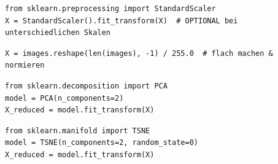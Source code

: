 
\begin{propertylist}[Faustregeln]
\end{propertylist}

\begin{codebox}
\begin{lstlisting}[style=CodeExpert]
from sklearn.preprocessing import StandardScaler
X = StandardScaler().fit_transform(X)  # OPTIONAL bei unterschiedlichen Skalen
\end{lstlisting}
\end{codebox}

\begin{codebox}
\begin{lstlisting}[style=CodeExpert]
X = images.reshape(len(images), -1) / 255.0  # flach machen & normieren
\end{lstlisting}
\end{codebox}

\begin{codebox}
\begin{lstlisting}[style=CodeExpert]
from sklearn.decomposition import PCA
model = PCA(n_components=2)
X_reduced = model.fit_transform(X)
\end{lstlisting}
\end{codebox}

\begin{codebox}
\begin{lstlisting}[style=CodeExpert]
from sklearn.manifold import TSNE
model = TSNE(n_components=2, random_state=0)
X_reduced = model.fit_transform(X)
\end{lstlisting}
\end{codebox}
